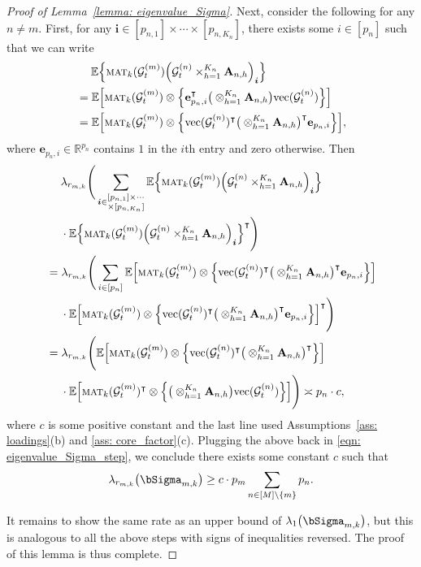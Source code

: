 \documentclass[aos]{imsart}
\theoremstyle{plain}
\theoremstyle{definition}
\def\mat{\textnormal{\textsc{mat}}}
\def\E{\mathbb{E}}
\def\R{\mathbb{R}}
\def\cG{\mathcal{G}} \def\cH{\boldsymbol{\mathcal{H}}} \def\cI{\mathcal{I}}
\def\bi{\boldsymbol{i}}
\def\be{\mathbf{e}}
\def\bA{\mathbf{A}}
\def\trans{\intercal}
\def\vec{\mathrm{vec}}
\newcommand{\ZC}[1]{\textcolor{teal}{ZC: #1}}
\begin{document}
\begin{proof}[Proof of Lemma~\ref{lemma: eigenvalue_Sigma}]
Next, consider the following for any $n\neq m$.
First, for any $\bi\in [p_{n,1}] \times \cdots \times[p_{n,K_n}]$, there exists some $i\in[p_n]$ such that we can write
\begin{align*}
    &\;\quad
    \E\Big\{ \mat_k(\cG_t^{(m)}) \Big( \cG_t^{(n)} \times_{h=1}^{K_n} \bA_{n,h} \Big)_{\bi} \Big\} \\
    &=
    \E\Big[ \mat_k(\cG_t^{(m)}) \otimes \Big\{ \be_{p_n,i}^\trans \big( \otimes_{h=1}^{K_n} \bA_{n,h} \big) \vec(\cG_t^{(n)}) \Big\} \Big] \\
    &=
    \E\Big[ \mat_k(\cG_t^{(m)}) \otimes \Big\{ \vec(\cG_t^{(n)})^\trans \big( \otimes_{h=1}^{K_n} \bA_{n,h} \big)^\trans \be_{p_n,i} \Big\} \Big] ,
\end{align*}
where $\be_{p_n,i} \in\R^{p_n}$ contains $1$ in the $i$th entry and zero otherwise. Then
\begin{align}
    &\;\quad
    \lambda_{r_{m,k}}\Bigg( \sum_{\bi \in \substack{[p_{n,1}] \times \cdots\\ \times[p_{n,K_n}] }} \E\Big\{ \mat_k(\cG_t^{(m)}) \Big( \cG_t^{(n)} \times_{h=1}^{K_n} \bA_{n,h} \Big)_{\bi} \Big\} \notag \\
    &\;\quad
    \cdot \E\Big\{ \mat_k(\cG_t^{(m)}) \Big( \cG_t^{(n)} \times_{h=1}^{K_n} \bA_{n,h} \Big)_{\bi} \Big\}^\trans \Bigg) \notag \\
    &=
    \lambda_{r_{m,k}}\Bigg( \sum_{i \in [p_n]} \E\Big[ \mat_k(\cG_t^{(m)}) \otimes \Big\{ \vec(\cG_t^{(n)})^\trans \big( \otimes_{h=1}^{K_n} \bA_{n,h} \big)^\trans \be_{p_n,i} \Big\} \Big] \notag \\
    &\;\quad
    \cdot \E\Big[ \mat_k(\cG_t^{(m)}) \otimes \Big\{ \vec(\cG_t^{(n)})^\trans \big( \otimes_{h=1}^{K_n} \bA_{n,h} \big)^\trans \be_{p_n,i} \Big\} \Big]^\trans \Bigg) \notag \\
    &=
    \lambda_{r_{m,k}}\Bigg( \E\Big[ \mat_k(\cG_t^{(m)}) \otimes \Big\{ \vec(\cG_t^{(n)})^\trans \big( \otimes_{h=1}^{K_n} \bA_{n,h} \big)^\trans \Big\} \Big] \notag \\
    &\;\quad
    \cdot \E\Big[ \mat_k(\cG_t^{(m)})^\trans \otimes \Big\{ \big( \otimes_{h=1}^{K_n} \bA_{n,h} \big) \vec(\cG_t^{(n)}) \Big\} \Big] \Bigg) 
    \asymp
    p_n \cdot c ,
    \label{eqn: eigenvalue_Sigma_step_2}
\end{align}
where $c$ is some positive constant and the last line used Assumptions~\ref{ass: loadings}(b) and \ref{ass: core_factor}(c). Plugging the above back in \eqref{eqn: eigenvalue_Sigma_step}, we conclude there exists some constant $c$ such that
\[
\lambda_{r_{m,k}}\big( \bSigma_{m,k} \big) \geq c \cdot p_m \sum_{n\in[M] \setminus\{m\}} p_n .
\]

It remains to show the same rate as an upper bound of $\lambda_{1}\big( \bSigma_{m,k} \big)$, but this is analogous to all the above steps with signs of inequalities reversed. The proof of this lemma is thus complete.
\end{proof}
\end{document}
